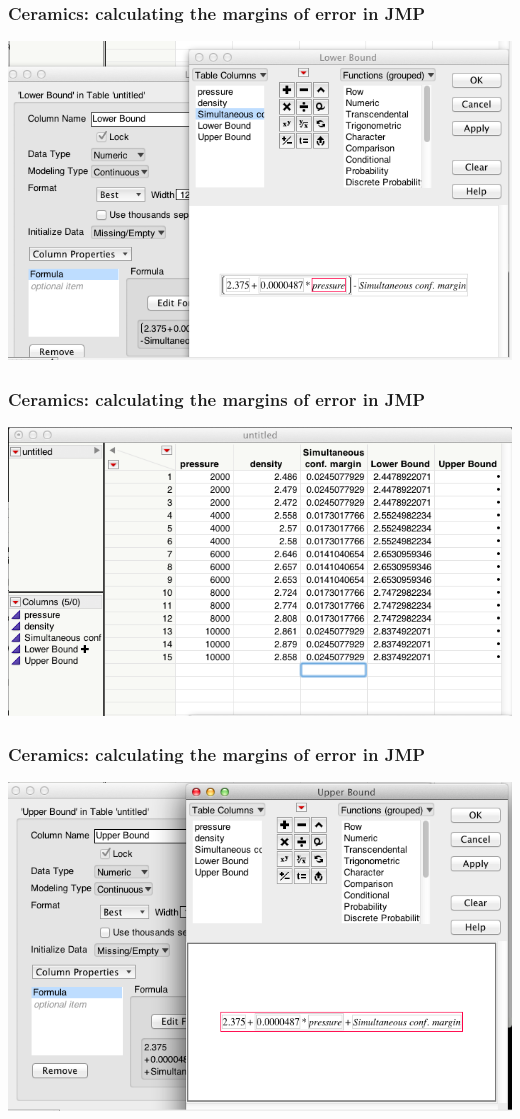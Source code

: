 \documentclass[handout]{beamer}\usepackage{graphicx, color}
\numberwithin{equation}{section}
\begin{document}
\begin{frame}
\frametitle{Ceramics: calculating the margins of error in JMP}
 \includegraphics{../../fig/simuljmp11.png}
\end{frame}

\begin{frame}
\frametitle{Ceramics: calculating the margins of error in JMP}
 \includegraphics{../../fig/simuljmp12.png}
\end{frame}

\begin{frame}
\frametitle{Ceramics: calculating the margins of error in JMP}
 \includegraphics{../../fig/simuljmp21.png}
\end{frame}
\end{document}
